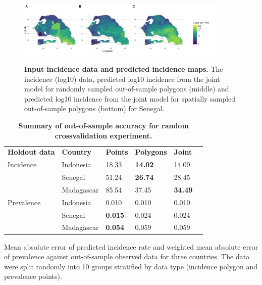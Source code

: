 \documentclass[10pt,letterpaper]{article}
\newlength\savedwidth
\newcommand\thickhline{\noalign{\global\savedwidth\arrayrulewidth\global\arrayrulewidth 2pt}%
\hline
\noalign{\global\arrayrulewidth\savedwidth}}
\begin{document}
\begin{figure}[!h]
\includegraphics[width = 0.9\textwidth]{figures/sen_both_cv12_preds.png}
\caption{{\bf Input incidence data and predicted incidence maps. } 
The incidence (log10) data, predicted log10 incidence from the joint model for randomly sampled out-of-sample polygons (middle) and predicted log10 incidence from the joint model for spatially sampled out-of-sample polygons (bottom) for Senegal.
}
\label{predobsmapsen}
\end{figure}



\begin{table}[!ht]
\begin{adjustwidth}{-2.25in}{0in} %
\centering
\caption{
{\bf Summary of out-of-sample accuracy for random crossvalidation experiment.}}
\begin{tabular}{llllll}
\hline
{\bf Holdout data} & {\bf Country} &  {\bf Points} & {\bf Polygons} & {\bf Joint} \\
\thickhline 
Incidence & Indonesia & 18.33 & {\bf 14.02} &  14.09\\
& Senegal & 51.24 & {\bf 26.74} &  28.45\\
& Madagascar & 85.54 & 37.45 &  {\bf 34.49}\vspace{3mm}\\
Prevalence & Indonesia & 0.010 & 0.010 &  0.010\\
& Senegal & {\bf 0.015} & 0.024 &  0.024\\
& Madagascar & {\bf 0.054} & 0.059 &  0.059\\
\end{tabular}
\begin{flushleft}
Mean absolute error of predicted incidence rate and weighted mean absolute error of prevalence against out-of-sample observed data for three countries.
The data were split randomly into 10 groups stratified by data type (incidence polygon and prevalence points).
\end{flushleft}
\label{table1}
\end{adjustwidth}
\end{table}
\end{document}
